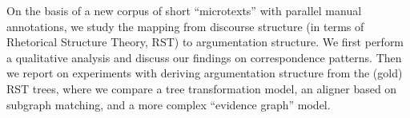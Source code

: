 On the basis of a new corpus of short ``microtexts'' with parallel manual annotations, we study the mapping from discourse structure (in terms of Rhetorical Structure Theory, RST) to argumentation structure. We first perform a qualitative analysis and discuss our findings on  correspondence patterns. Then we report on experiments with deriving argumentation structure from the (gold) RST trees, where we compare a tree transformation model, an aligner based on subgraph matching, and a more complex ``evidence graph'' model.
